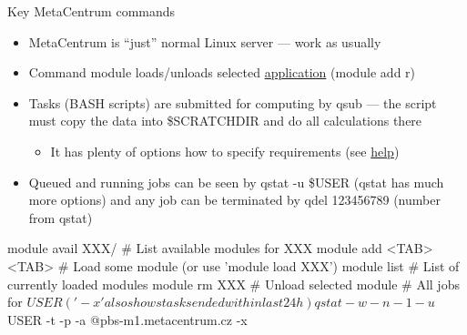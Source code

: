 \documentclass[compress,  xelatex, 11pt, xcolor=x11names, aspectratio=169,
	hyperref={
		bookmarks=true,
		unicode=true,
		colorlinks=true,
		pdftitle={HybSeq course},
		plainpages=false,
		pdfauthor={Vojtech Zeisek},
		pdfsubject={Practical processing of HybSeq target enrichment sequencing data on computing grids like MetaCentrum},
		pdfcreator={XeLaTeX},
		pdfkeywords={BASH, command line, GNU, HybSeq, Linux, MetaCentrum, sequencing shell, target enrichment},
		linkcolor=Turquoise4, %
		anchorcolor=DodgerBlue4, %
		citecolor=DodgerBlue4, %
		filecolor=DodgerBlue4, %
		menucolor=Tan4, %
		urlcolor=DarkOliveGreen4 %
		},
	url={hyphens, lowtilde} %
	]{beamer}
\renewcommand{\texttt}[1]{\colorbox{Cornsilk2}{{\ttfamily #1}}}
\begin{document}
\begin{frame}[fragile]{Key MetaCentrum commands}
	\begin{itemize}
		\item MetaCentrum is \enquote{just} normal Linux server --- work as usually
		\item Command \texttt{module} loads/unloads selected \href{https://docs.metacentrum.cz/en/docs/software/alphabet}{application} (\texttt{module add r})
		\item Tasks (BASH scripts) are submitted for computing by \texttt{qsub} --- the script must copy the data into \texttt{\$SCRATCHDIR} and do all calculations there
		\begin{itemize}
			\item It has plenty of options how to specify requirements (see \href{https://docs.metacentrum.cz/en/docs/computing/run-basic-job}{help})
		\end{itemize}
		\item Queued and running jobs can be seen by \texttt{qstat -u \$USER} (\texttt{qstat} has much more options) and any job can be terminated by \texttt{qdel 123456789} (number from \texttt{qstat})
	\end{itemize}
	\vfill
	\begin{bashcode}
    module avail XXX/ # List available modules for XXX
    module add <TAB><TAB> # Load some module (or use 'module load XXX')
    module list # List of currently loaded modules
    module rm XXX # Unload selected module
    # All jobs for $USER ('-x' also shows tasks ended within last 24 h)
    qstat -w -n -1 -u $USER -t -p -a @pbs-m1.metacentrum.cz -x
	\end{bashcode}
\end{frame}
\end{document}

